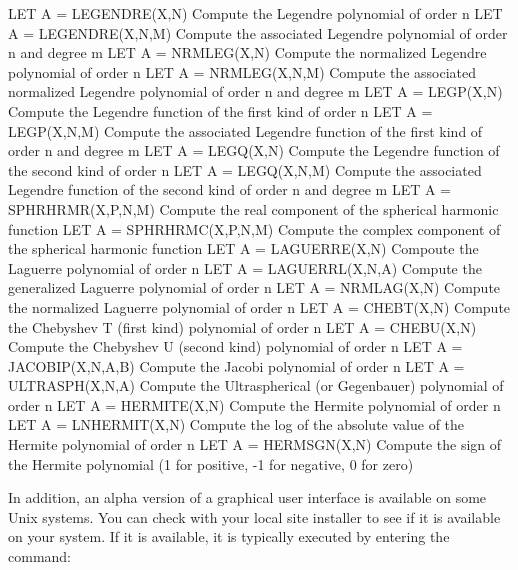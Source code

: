 {   LET A = LEGENDRE(X,N)       Compute the Legendre polynomial of
                               order n
   LET A = LEGENDRE(X,N,M)     Compute the associated Legendre
                               polynomial of order n and degree m
   LET A = NRMLEG(X,N)         Compute the normalized Legendre
                               polynomial of order n
   LET A = NRMLEG(X,N,M)       Compute the associated normalized
                               Legendre polynomial of order n and
                               degree m
   LET A = LEGP(X,N)           Compute the Legendre function of the
                               first kind of order n
   LET A = LEGP(X,N,M)         Compute the associated Legendre function
                               of the first kind of order n and degree m
   LET A = LEGQ(X,N)           Compute the Legendre function of the
                               second kind of order n
   LET A = LEGQ(X,N,M)         Compute the associated Legendre function
                               of the second kind of order n and
                               degree m
   LET A = SPHRHRMR(X,P,N,M)   Compute the real component of the
                               spherical harmonic function
   LET A = SPHRHRMC(X,P,N,M)   Compute the complex component of the
                               spherical harmonic function
   LET A = LAGUERRE(X,N)       Compoute the Laguerre polynomial of
                               order n
   LET A = LAGUERRL(X,N,A)     Compute the generalized Laguerre
                               polynomial of order n
   LET A = NRMLAG(X,N)         Compute the normalized Laguerre
                               polynomial of order n
   LET A = CHEBT(X,N)          Compute the Chebyshev T (first kind)
                               polynomial of order n
   LET A = CHEBU(X,N)          Compute the Chebyshev U (second kind)
                               polynomial of order n
   LET A = JACOBIP(X,N,A,B)    Compute the Jacobi polynomial of order n
   LET A = ULTRASPH(X,N,A)     Compute the Ultraspherical (or
                               Gegenbauer) polynomial of order n
   LET A = HERMITE(X,N)        Compute the Hermite polynomial of order n
   LET A = LNHERMIT(X,N)       Compute the log of the absolute value of
                               the Hermite polynomial of order n
   LET A = HERMSGN(X,N)        Compute the sign of the Hermite
                               polynomial (1 for positive, -1 for
                               negative, 0 for zero)

In addition, an alpha version of a graphical user interface is
available on some Unix systems.  You can check with your local site
installer to see if it is available on your system.  If it is
available, it is typically executed by entering the command:

}
